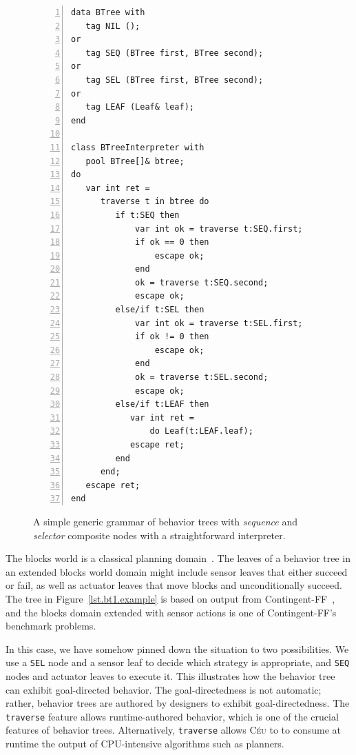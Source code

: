 \documentclass{sig-alternate}
\newcommand{\CEU}{\textsc{C\'{e}u}\xspace}
\newcommand{\code}[1] {{\small{\texttt{#1}}}}
\begin{document}
\begin{figure}[t]
\begin{lstlisting}[numbers=left,xleftmargin=3em]
data BTree with
   tag NIL ();
or
   tag SEQ (BTree first, BTree second);
or
   tag SEL (BTree first, BTree second);
or
   tag LEAF (Leaf& leaf);
end

class BTreeInterpreter with
   pool BTree[]& btree;
do
   var int ret =
      traverse t in btree do
         if t:SEQ then
             var int ok = traverse t:SEQ.first;
             if ok == 0 then
                 escape ok;
             end
             ok = traverse t:SEQ.second;
             escape ok;
         else/if t:SEL then
             var int ok = traverse t:SEL.first;
             if ok != 0 then
                 escape ok;
             end
             ok = traverse t:SEL.second;
             escape ok;
         else/if t:LEAF then
            var int ret =
                do Leaf(t:LEAF.leaf);
            escape ret;
         end
      end;
   escape ret;
end
\end{lstlisting}
\caption{
A simple generic grammar of behavior trees with \emph{sequence} and 
\emph{selector} composite nodes with a straightforward interpreter.
\label{lst.bt1}
}
\end{figure}

The blocks world is a classical planning domain~\cite{slaney2001blocks}.
The leaves of a behavior tree in an extended blocks world domain
might include sensor leaves that either succeed or fail,
as well as actuator leaves that move blocks and unconditionally succeed.
The tree in Figure~\ref{lst.bt1.example} is based on output from Contingent-FF~\cite{hoffmann2005contingent},
and the blocks domain extended with sensor actions is one of Contingent-FF's benchmark problems.

In this case, we have somehow pinned down the
situation to two possibilities.
%
We use a \code{SEL} node and a sensor leaf to decide which strategy is appropriate,
and \code{SEQ} nodes and actuator leaves to execute it.
This illustrates how the behavior tree can exhibit goal-directed behavior.
The goal-directedness is not automatic; rather, behavior trees are authored
by designers to exhibit goal-directedness.
The \code{traverse} feature allows runtime-authored behavior, 
which is one of the crucial features of behavior trees.
Alternatively, \code{traverse} allows \CEU to
to consume at runtime the output of CPU-intensive algorithms such as planners.
\end{document}
